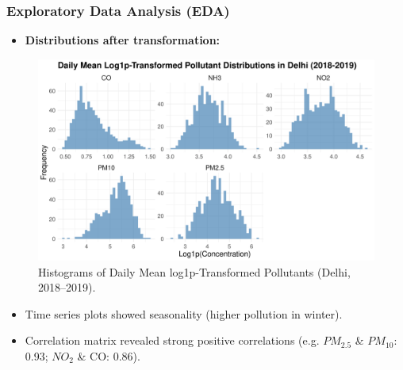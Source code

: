 \documentclass[svgnames, 12pt]{beamer}
\begin{document}
\begin{frame}
    \frametitle{Exploratory Data Analysis (EDA)}
    \begin{itemize}
        \item \textbf{Distributions after transformation:}
    \end{itemize}
    \begin{figure}
        \includegraphics[width=0.8\linewidth]{../analysis/assets/log1p_delhi_distributions.png}
        \caption{Histograms of Daily Mean log1p-Transformed Pollutants (Delhi, 2018--2019).}
    \end{figure}
    \begin{itemize}
        \item Time series plots showed seasonality (higher pollution in winter).
        \item Correlation matrix revealed strong positive correlations (e.g. $PM_{2.5}$ \& $PM_{10}$: 0.93; $NO_2$ \& CO: 0.86).
    \end{itemize}
\end{frame}
\end{document}
